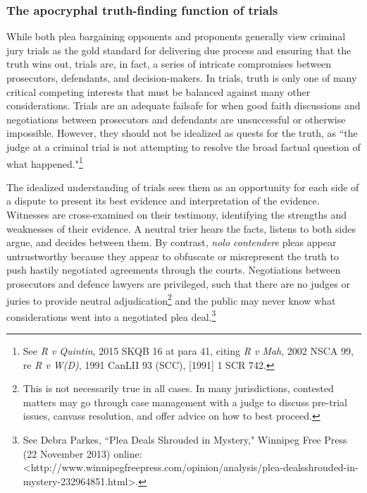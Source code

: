 \subsubsection{The apocryphal truth-finding function of trials}

While both plea bargaining opponents and proponents generally view criminal jury trials as the gold standard for delivering due process and ensuring that the truth wins out, trials are, in fact, a series of intricate compromises between prosecutors, defendants, and decision-makers. In trials, truth is only one of many critical competing interests that must be balanced against many other considerations. Trials are an adequate failsafe for when good faith discussions and negotiations between prosecutors and defendants are unsuccessful or otherwise impossible. However, they should not be idealized as quests for the truth, as ``the judge at a criminal trial is not attempting to resolve the broad factual question of what happened."\footnote{See \textit{R v Quintin}, 2015 SKQB 16 at para 41, citing \textit{R v Mah}, 2002 NSCA 99, re \textit{R v W(D)}, 1991 CanLII 93 (SCC), [1991] 1 SCR 742.}

The idealized understanding of trials sees them as an opportunity for each side of a dispute to present its best evidence and interpretation of the evidence. Witnesses are cross-examined on their testimony, identifying the strengths and weaknesses of their evidence. A neutral trier hears the facts, listens to both sides argue, and decides between them. By contrast, \textit{nolo contendere} pleas appear untrustworthy because they appear to obfuscate or misrepresent the truth to push hastily negotiated agreements through the courts. Negotiations between prosecutors and defence lawyers are privileged, such that there are no judges or juries to provide neutral adjudication\footnote{This is not necessarily true in all cases. In many jurisdictions, contested matters may go through case management with a judge to discuss pre-trial issues, canvass resolution, and offer advice on how to best proceed.} and the public may never know what considerations went into a negotiated plea deal.\footnote{See Debra Parkes, ``Plea Deals Shrouded in Mystery," Winnipeg Free Press (22 November 2013) online: \textless http://www.winnipegfreepress.com/opinion/analysis/plea-dealsshrouded-in-mystery-232964851.html\textgreater.}

